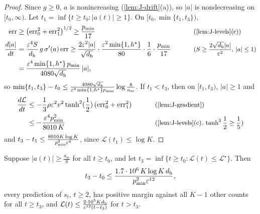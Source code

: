 \begin{proof}
Since $g\ge0$, $a$ is nonincreasing (\cref{lem:J-drift}(a)), so $|a|$ is nondecreasing on $[t_0,\infty)$. Let $t_1=\inf\{t\ge t_0:|a(t)|\ge1\}$. On
$[t_0,\min\{t_1,t_3\})$,
\begin{alignat*}{2}
 \mathrm{err}&\ge\bigl(\mathrm{err}_0^2+\mathrm{err}_1^2\bigr)^{1/2}\ge\frac{p_{\min}}{17} &\qquad& \why{\cref{lem:J-levels}(c)}\\
 \frac{d|a|}{dt}&=\frac{\initscale^4S}{d_{\mathrm h}}\,g\,\sigma'(a)\,\mathrm{err}\ge\frac{2\initscale^2|a|}{\sqrt{d_{\mathrm h}}}\cdot\frac{\initscale^2\min\{1,h^\star\}}{80}\cdot\frac{1}{6}\cdot\frac{p_{\min}}{17} && \why{$S\ge\frac{2\sqrt{d_{\mathrm h}}|a|}{\initscale^2}$, $|a|\le1$}\\
 &=\frac{\initscale^4\min\{1,h^\star\}\,p_{\min}}{4080\sqrt{d_{\mathrm h}}}\,|a|,
\end{alignat*}
so $\min\{t_1,t_3\}-t_0\le\frac{4080\sqrt{d_{\mathrm h}}}{\varepsilon^4\min\{1,h^\star\}p_{\min}}\log\frac{8}{a_{\mathrm{sc}}}$. If $t_1<t_3$, then on $[t_1,t_3)$, $|a|\ge1$ and
\begin{alignat*}{2}
 \ddt{\mathcal L}&\le-\tfrac{1}{3}\rho\initscale^2v^2\tanh^2(\tfrac{1}{2})\,(\mathrm{err}_0^2+\mathrm{err}_1^2) &\qquad& \why{\cref{lem:J-gradient}}\\
 &\le-\frac{\initscale^4p_{\min}^2}{8010\,K} && \why{\cref{lem:J-levels}(c), $\tanh^2\tfrac{1}{2}\ge\tfrac{1}{5}$}
\end{alignat*}
and $t_3-t_1\le\frac{8010K\log K}{p_{\min}^2\varepsilon^4}$, since $\mathcal L(t_1)\le\log K$.
\end{proof}

\begin{lemma}[Descent]
\label{lem:J-descent}
Suppose $|a(t)|\ge\frac{a_{\mathrm{sc}}}{8}$ for all $t\ge t_0$, and let $t_3=\inf\{t\ge t_0:\mathcal L(t)\le \mathcal L^\star\}$. Then
\[
 t_3-t_0\le\frac{1.7\cdot10^6\,K\log K\,d_{\mathrm h}}{p_{\min}^2\varepsilon^{12}},
\]
every prediction of $s_t$, $t\ge2$, has positive margin against all $K-1$ other counts for all $t\ge t_3$, and
$\mathcal L(t)\le\frac{2\cdot10^5Kd_{\mathrm h}}{\varepsilon^{12}(t-t_3)}$ for $t>t_3$.
\end{lemma}

